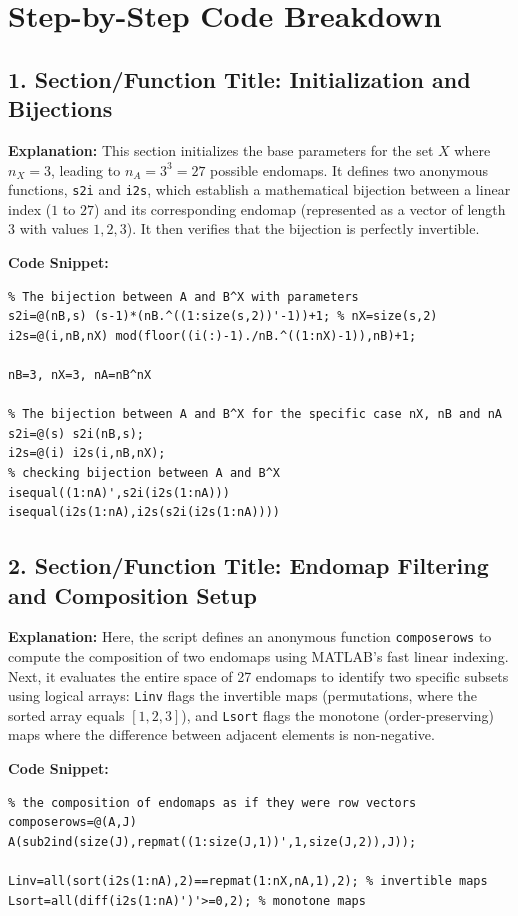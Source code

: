 \newpage
\section{Step-by-Step Code Breakdown}

\subsection{1. Section/Function Title: Initialization and Bijections}
\textbf{Explanation:} 
This section initializes the base parameters for the set $X$ where $n_X = 3$, leading to $n_A = 3^3 = 27$ possible endomaps. It defines two anonymous functions, \texttt{s2i} and \texttt{i2s}, which establish a mathematical bijection between a linear index ($1$ to $27$) and its corresponding endomap (represented as a vector of length 3 with values $1, 2, 3$). It then verifies that the bijection is perfectly invertible.

\textbf{Code Snippet:}
\begin{lstlisting}
% The bijection between A and B^X with parameters
s2i=@(nB,s) (s-1)*(nB.^((1:size(s,2))'-1))+1; % nX=size(s,2)
i2s=@(i,nB,nX) mod(floor((i(:)-1)./nB.^((1:nX)-1)),nB)+1; 

nB=3, nX=3, nA=nB^nX

% The bijection between A and B^X for the specific case nX, nB and nA
s2i=@(s) s2i(nB,s); 
i2s=@(i) i2s(i,nB,nX);
% checking bijection between A and B^X
isequal((1:nA)',s2i(i2s(1:nA)))
isequal(i2s(1:nA),i2s(s2i(i2s(1:nA))))
\end{lstlisting}

\subsection{2. Section/Function Title: Endomap Filtering and Composition Setup}
\textbf{Explanation:} 
Here, the script defines an anonymous function \texttt{composerows} to compute the composition of two endomaps using MATLAB's fast linear indexing. Next, it evaluates the entire space of 27 endomaps to identify two specific subsets using logical arrays: \texttt{Linv} flags the invertible maps (permutations, where the sorted array equals $[1, 2, 3]$), and \texttt{Lsort} flags the monotone (order-preserving) maps where the difference between adjacent elements is non-negative.

\textbf{Code Snippet:}
\begin{lstlisting}
% the composition of endomaps as if they were row vectors
composerows=@(A,J) A(sub2ind(size(J),repmat((1:size(J,1))',1,size(J,2)),J)); 

Linv=all(sort(i2s(1:nA),2)==repmat(1:nX,nA,1),2); % invertible maps
Lsort=all(diff(i2s(1:nA)')'>=0,2); % monotone maps
\end{lstlisting}

